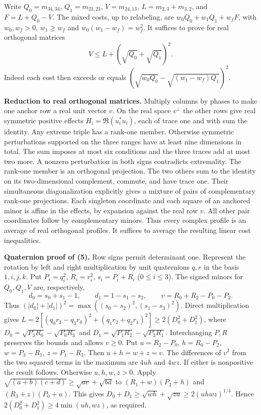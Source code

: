 \documentclass[11pt]{article}
\begin{document}
\par Write $Q_0=m_{34,34}$, $Q_1=m_{23,23}$, $V=m_{24,13}$, $L=m_{2,3}+m_{3,2}$, and $F=L+Q_0-V$. The mixed costs, up to relabeling, are $w_0Q_0+w_1Q_1+w_f F$, with $w_0,w_f>0$, $w_1\ge w_f$ and $w_0(w_1-w_f)=w_f^2$. It suffices to prove for real orthogonal matrices
\[
 V\le L+(\sqrt{Q_0}+\sqrt{Q_1})^2. \tag{5}
\]
Indeed each cost then exceeds or equals $(\sqrt{w_0Q_0}-\sqrt{(w_1-w_f)Q_1})^2$.
\par\textbf{Reduction to real orthogonal matrices.} Multiply columns by phases to make one anchor row a real unit vector $v$. On the real space $v^\perp$ the other rows give real symmetric positive effects $H_i=\Re(u_i^*u_i)$, each of trace one and with sum the identity. Any extreme triple has a rank-one member. Otherwise symmetric perturbations supported on the three ranges have at least nine dimensions in total. The sum imposes at most six conditions and the three traces add at most two more. A nonzero perturbation in both signs contradicts extremality. The rank-one member is an orthogonal projection. The two others sum to the identity on its two-dimensional complement, commute, and have trace one. Their simultaneous diagonalization explicitly gives a mixture of pairs of complementary rank-one projections. Each singleton coordinate and each square of an anchored minor is affine in the effects, by expansion against the real row $v$. All other pair coordinates follow by complementary minors. Thus every complex profile is an average of real orthogonal profiles. It suffices to average the resulting linear cost inequalities.
\par\textbf{Quaternion proof of (5).} Row signs permit determinant one. Represent the rotation by left and right multiplication by unit quaternions $q,r$ in the basis $1,i,j,k$. Put $P_i=q_i^2$, $R_i=r_i^2$, $s_i=P_i+R_i$ ($0\le i\le3$). The signed minors for $Q_0,Q_1,V$ are, respectively,
\[
 d_0=s_0+s_1-1,\qquad d_1=1-s_1-s_2,\qquad v=R_0+R_2-P_0-P_2.
\]
Thus $(|d_0|+|d_1|)^2=\max((s_0-s_2)^2,(s_1-s_3)^2)$. Direct multiplication gives $L=2[(q_0r_3-q_3r_0)^2+(q_1r_2+q_2r_1)^2]\ge2(D_0^2+D_1^2)$, where $D_0=\sqrt{P_3R_0}-\sqrt{P_0R_3}$ and $D_1=\sqrt{P_1R_2}-\sqrt{P_2R_1}$. Interchanging $P,R$ preserves the bounds and allows $v\ge0$. Put $u=R_2-P_0$, $h=R_0-P_2$, $w=P_3-R_1$, $z=P_1-R_3$. Then $u+h=w+z=v$. The differences of $v^2$ from the two squared terms in the maximum are $4uh$ and $4wz$. If either is nonpositive the result follows. Otherwise $u,h,w,z>0$. Apply $\sqrt{(a+b)(c+d)}\ge\sqrt{ac}+\sqrt{bd}$ to $(R_1+w)(P_2+h)$ and $(R_3+z)(P_0+u)$. This gives $D_0+D_1\ge\sqrt{wh}+\sqrt{zu}\ge2(uhwz)^{1/4}$. Hence $2(D_0^2+D_1^2)\ge4\min(uh,wz)$, as required.
\end{document}
